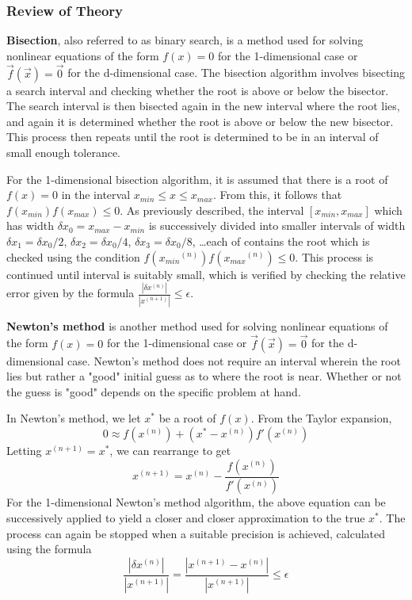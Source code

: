 \documentclass[10pt]{article}
\begin{document}
\subsubsection*{Review of Theory}

\textbf{Bisection}, also referred to as binary search, is a method used for solving nonlinear equations of the 
form $f(x)=0$ for the 1-dimensional case or $\vec{f}(\vec{x})=\vec{0}$ for the d-dimensional case. The
bisection algorithm involves bisecting a search interval and checking whether the root is above or 
below the bisector. The search interval is then bisected again in the new interval where the root lies, 
and again it is determined whether the root is above or below the new bisector. This process then repeats
until the root is determined to be in an interval of small enough tolerance. 

For the 1-dimensional bisection algorithm, it is assumed that there is a root of $f(x)=0$ in the interval
$x_{min} \leq x \leq x_{max}$. From this, it follows that $f(x_{min})f(x_{max}) \leq 0$. As previously 
described, the interval $[x_{min}, x_{max}]$ which has width $\delta x_0 = x_{max} - x_{min}$ is
successively divided into smaller intervals of width $\delta x_1 = \delta x_0/2$, 
$\delta x_2 = \delta x_0/4$, $\delta x_3 = \delta x_0/8$, \ldots each of contains the root which is 
checked using the condition $f({x_{min}}^{(n)})f({x_{max}}^{(n)}) \leq 0$. This process is continued until 
interval is suitably small, which is verified by checking the relative error given by the formula
$\frac{| \delta x^{(n)} |}{| x^{(n+1)} |} \leq \epsilon$.

\textbf{Newton's method} is another method used for solving nonlinear equations of the form $f(x)=0$ for the 
1-dimensional case or $\vec{f}(\vec{x})=\vec{0}$ for the d-dimensional case. Newton's method does not 
require an interval wherein the root lies but rather a "good" initial guess as to where the root is near.
Whether or not the guess is "good" depends on the specific problem at hand.

In Newton's method, we let $x^*$ be a root of $f(x)$. From the Taylor expansion,
$$0 \approx f(x^{(n)}) + (x^* - x^{(n)})f'(x^{(n)})$$
Letting $x^{(n+1)} = x^*$, we can rearrange to get
$$x^{(n+1)} = x^{(n)} - \frac{f(x^{(n)})}{f'(x^{(n)})}$$
For the 1-dimensional Newton's method algorithm, the above equation can be successively applied to yield a 
closer and closer approximation to the true $x^*$. The process can again be stopped when a suitable precision
is achieved, calculated using the formula 
$$\frac{| \delta x^{(n)} |}{| x^{(n+1)} |} = \frac{| x^{(n+1)}-x^{(n)} |}{| x^{(n+1)} |} \leq \epsilon$$
\end{document}
